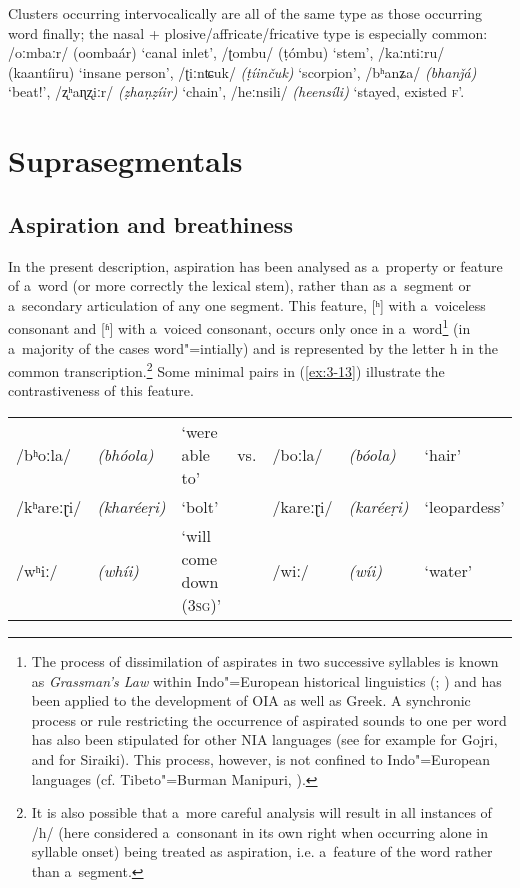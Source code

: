 Clusters occurring intervocalically are all of the same type as those occurring word finally; the nasal + plosive/affricate/fricative type is especially common: /oːmbaːr/ (oombaár) `canal inlet', /ʈombu/ (ṭómbu) `stem', /kaːntiːru/ (kaantíiru) `insane person', /ʈiːnʨuk/ \textit{(ṭíinčuk)} `scorpion', /bʰanʑa/ \textit{(bhanǰá)} `beat!', /ʐʰaɳʐiːr/ \textit{(ẓhaṇẓíir)} `chain', /heːnsili/ \textit{(heensíli)} `stayed, existed \textsc{f}'. 


\section{Suprasegmentals}
\label{sec:3-4}

\subsection{Aspiration and breathiness}
\label{subsec:3-4-1}

In the present description, aspiration has been analysed as a~property or feature of a~word (or more correctly the lexical stem), rather than as a~segment or a~secondary articulation of any one segment. This feature, [ʰ] with a~voiceless consonant and [ʱ] with a~voiced consonant, occurs only once in a~word\footnote{\label{fnt:ftn32} The process of dissimilation of aspirates in two successive syllables is known as \textit{Grassman's Law} within Indo"=European historical linguistics (\citealt[19, 56]{szemerenyi1996}; \citealt[92--93]{lehmann1962}) and has been applied to the development of OIA as well as Greek. A synchronic process or rule restricting the occurrence of aspirated sounds to one per word has also been stipulated for other NIA languages (see for example \citealt[32]{losey2002} for Gojri, and \citealt[34--35]{shackle1976} for Siraiki). This process, however, is not confined to Indo"=European languages (cf. Tibeto"=Burman Manipuri, \citealt[13--14]{bhatningomba1997}).} (in a~majority of the cases word"=intially) and is represented by the letter h in the common transcription.\footnote{It is also possible that a~more careful analysis will result in all instances of /h/ (here considered a~consonant in its own right when occurring alone in syllable onset) being treated as aspiration, i.e. a~feature of the word rather than a~segment.} Some minimal pairs in (\ref{ex:3-13}) illustrate the contrastiveness of this feature.
\begin{exe}
\extab
\label{ex:3-13}
\begin{tabularx}{116mm}{ l l Q l l l Q }
/bʰoːla/ &
\textit{(bhóola)} &
`were able to' &
vs. &
/boːla/ &
\textit{(bóola)} &
`hair'\\
/kʰareːɽi/ &
\textit{(kharéeṛi)} &
`bolt' &
&
/kareːɽi/ &
\textit{(karéeṛi)} &
`leop\-ardess'\\
/wʰiː/
&
\textit{(whíi)}
&
`will come down (\textsc{3sg})' &
&
/wiː/
&
\textit{(wíi)}
&
`water'\\
\end{tabularx}
\end{exe}



